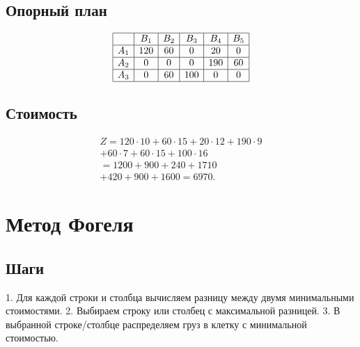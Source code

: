 \documentclass{article}
\begin{document}
\subsection{Опорный план}
\[
\begin{array}{|c|c|c|c|c|c|}
\hline
 & B_1 & B_2 & B_3 & B_4 & B_5 \\
\hline
A_1 & 120 & 60 & 0 & 20 & 0 \\
\hline
A_2 & 0 & 0 & 0 & 190 & 60 \\
\hline
A_3 & 0 & 60 & 100 & 0 & 0 \\
\hline
\end{array}
\]

\subsection{Стоимость}
\begin{multline}
Z = 120 \cdot 10 + 60 \cdot 15 + 20 \cdot 12 + 190 \cdot 9 \\
+ 60 \cdot 7 + 60 \cdot 15 + 100 \cdot 16 \\
= 1200 + 900 + 240 + 1710 \\
+ 420 + 900 + 1600 = 6970.
\end{multline}

\section{Метод Фогеля}

\subsection{Шаги}
1. Для каждой строки и столбца вычисляем разницу между двумя минимальными стоимостями.  
2. Выбираем строку или столбец с максимальной разницей.  
3. В выбранной строке/столбце распределяем груз в клетку с минимальной стоимостью.
\end{document}
